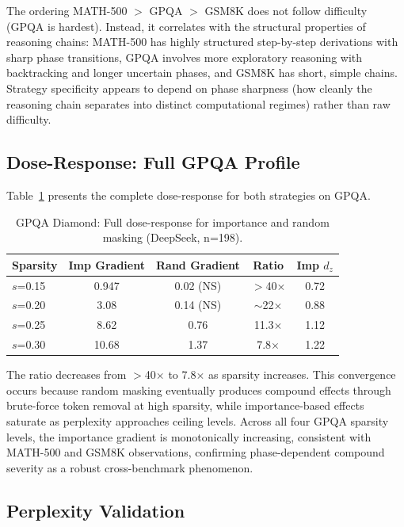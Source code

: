 \documentclass[11pt,a4paper]{article}
\begin{document}
The ordering MATH-500 $>$ GPQA $>$ GSM8K does not follow difficulty (GPQA is hardest). Instead, it correlates with the structural properties of reasoning chains: MATH-500 has highly structured step-by-step derivations with sharp phase transitions, GPQA involves more exploratory reasoning with backtracking and longer uncertain phases, and GSM8K has short, simple chains. Strategy specificity appears to depend on phase sharpness (how cleanly the reasoning chain separates into distinct computational regimes) rather than raw difficulty.

\subsection{Dose-Response: Full GPQA Profile}

Table~\ref{tab:gpqa_dose} presents the complete dose-response for both strategies on GPQA.

\begin{table}[h]
\centering
\caption{GPQA Diamond: Full dose-response for importance and random masking (DeepSeek, n=198).}
\label{tab:gpqa_dose}
\begin{tabular}{lcccc}
\toprule
Sparsity & Imp Gradient & Rand Gradient & Ratio & Imp $d_z$ \\
\midrule
$s$=0.15 & 0.947 & 0.02 (NS) & $>$40$\times$ & 0.72 \\
$s$=0.20 & 3.08 & 0.14 (NS) & $\sim$22$\times$ & 0.88 \\
$s$=0.25 & 8.62 & 0.76 & 11.3$\times$ & 1.12 \\
$s$=0.30 & 10.68 & 1.37 & 7.8$\times$ & 1.22 \\
\bottomrule
\end{tabular}
\end{table}

The ratio decreases from $>$40$\times$ to 7.8$\times$ as sparsity increases. This convergence occurs because random masking eventually produces compound effects through brute-force token removal at high sparsity, while importance-based effects saturate as perplexity approaches ceiling levels. Across all four GPQA sparsity levels, the importance gradient is monotonically increasing, consistent with MATH-500 and GSM8K observations, confirming phase-dependent compound severity as a robust cross-benchmark phenomenon.

\subsection{Perplexity Validation}
\end{document}
